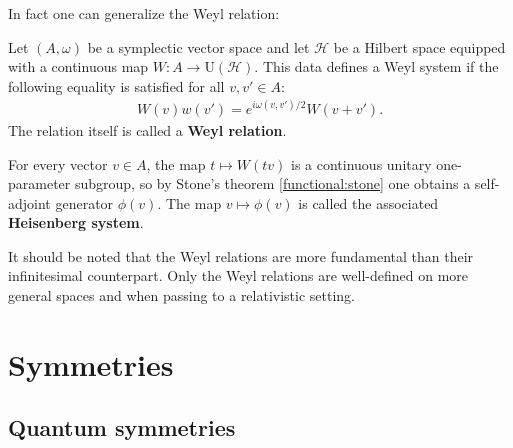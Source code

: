     In fact one can generalize the Weyl relation:
    \begin{definition}
        Let $(A,\omega)$ be a symplectic vector space and let $\mathcal{H}$ be a Hilbert space equipped with a continuous map $W:A\rightarrow\mathrm{U}(\mathcal{H})$. This data defines a Weyl system if the following equality is satisfied for all $v,v'\in A$:
        \begin{gather}
            W(v)w(v')=e^{i\omega(v,v')/2}W(v+v').
        \end{gather}
        The relation itself is called a \textbf{Weyl relation}.

        For every vector $v\in A$, the map $t\mapsto W(tv)$ is a continuous unitary one-parameter subgroup, so by Stone's theorem \ref{functional:stone} one obtains a self-adjoint generator $\phi(v)$. The map $v\mapsto\phi(v)$ is called the associated \textbf{Heisenberg system}.
    \end{definition}
    \begin{remark}
        It should be noted that the Weyl relations are more fundamental than their infinitesimal counterpart. Only the Weyl relations are well-defined on more general spaces and when passing to a relativistic setting.
    \end{remark}

\section{Symmetries}
\subsection{Quantum symmetries}



